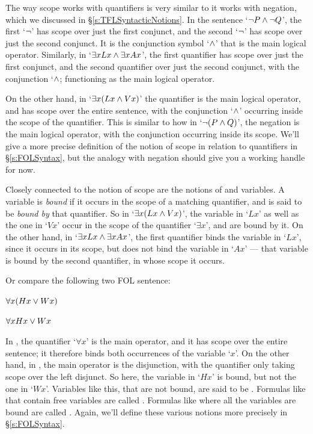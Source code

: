 The way scope works with quantifiers is very similar to it works with negation, which we discussed in \S\ref{s:TFLSyntacticNotions}.   In the sentence `$\neg P \wedge \neg Q$', the first `$\neg$' has scope over just the first conjunct, and the second `$\neg$' has scope over just the second conjunct.   It is the conjunction symbol `$\wedge$' that is the main logical operator.  Similarly, in `$\exists xLx \wedge \exists xAx$', the first quantifier has scope over just the first conjunct, and the second quantifier over just the second conjunct, with the conjunction `$\wedge$; functioning as the main logical operator.

On the other hand, in `$\exists x(Lx \wedge Vx)$' the quantifier is the main logical operator, and has scope over the entire sentence, with the conjunction `$\wedge$' occurring inside the scope of the quantifier.  This is similar to how in `$\neg (P \wedge Q)$', the negation is the main logical operator, with the conjunction occurring inside its scope.  We'll give a more precise definition of the notion of scope in relation to quantifiers in \S\ref{s:FOLSyntax}, but the analogy with negation should give you a working handle for now.

Closely connected to the notion of scope are the notions of  and  variables.  A variable is \emph{bound} if it occurs in the scope of a matching quantifier, and is said to be \emph{bound by} that quantifier.  So in `$\exists x(Lx \wedge Vx)$',  the variable in `$Lx$' as well as the one in `$Vx$' occur in the scope of the quantifier `$\exists x$', and are bound by it.  On the other hand, in `$\exists xLx \wedge \exists xAx$', the first quantifier binds the variable in `$Lx$', since it occurs in its scope, but does not bind the variable in `$Ax$'  --- that variable is bound by the second quantifier, in whose scope it occurs.

Or compare the following two FOL sentence:

	\begin{earg}
		\item[\ex{bound1}] $\forall x(Hx \vee Wx)$
		\item[\ex{bound2}] $\forall xHx \vee Wx$
	\end{earg}
In , the quantifier `$\forall x$' is the main operator, and it has scope over the entire sentence; it therefore binds both occurrences of the variable `$x$'.  On the other hand, in , the main operator is the disjunction, with the quantifier only taking scope over the left disjunct.  So here, the variable in `$Hx$' is bound, but not the one in `$Wx$'.  Variables like this, that are not bound, are said to be .  Formulas like  that contain free variables are called .  Formulas like  where all the variables are bound are called .  Again, we'll define these various notions more precisely in \S\ref{s:FOLSyntax}.

